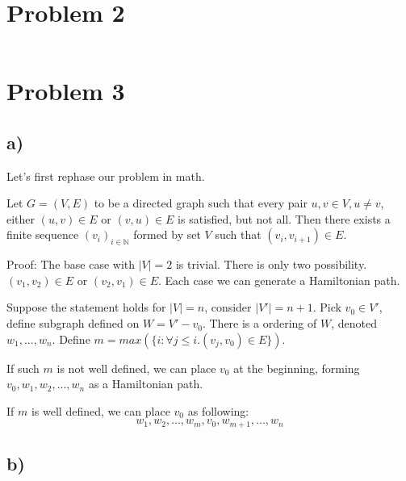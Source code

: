 \documentclass{article}
\begin{document}
\section*{Problem 2}
\inputminted{python}{p2.py}
\section*{Problem 3}
\subsection*{a)}
Let's first rephase our problem in math.

Let $G = (V, E)$ to be a directed graph such that
every pair $u, v \in V, u \neq v$, either $(u, v) \in E$ or
$(v, u) \in E$ is satisfied, but not all. Then there exists a finite sequence $(v_i)_{i \in \mathbb{N}}$
formed by set $V$ such that $(v_i, v_{i + 1}) \in E$.

Proof: 
The base case with $|V| = 2$ is trivial. There is only
two possibility. $(v_1, v_2) \in E$ or $(v_2, v_1) \in E$.
Each case we can generate a Hamiltonian path.

Suppose the statement holds for $|V| = n$, consider
$|V'| = n + 1$. Pick $v_0 \in V'$, define subgraph
defined on $W = V' - {v_0}$. There is a ordering of $W$, denoted
$w_1, ..., w_n$. Define $m = max(\{i:\forall j \leq i. (v_j, v_0) \in E \})$.

If such $m$ is not well defined, we can place $v_0$ at the beginning,
forming $v_0, w_1, w_2, ..., w_n$ as a Hamiltonian path.

If $m$ is well defined, we can place $v_0$ as following:
$$w_1, w_2, ..., w_m, v_0, w_{m + 1}, ..., w_n$$

\subsection*{b)}
\inputminted{python}{p3.py}
\end{document}
